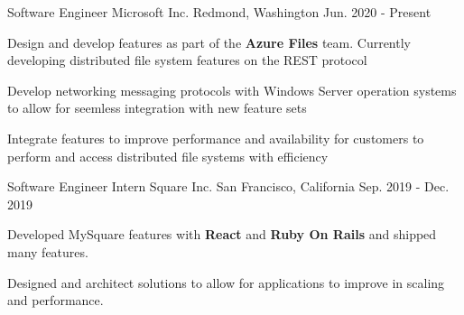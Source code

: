 


\begin{cventries}

\begin{comment}
\cventry
{Software Engineer Intern}
{Microsoft}
{Redmond, Washington}
{Jun. 2018 - Sep. 2018}
{
\begin{cvitems}
\item {Will develop on the frameworks team}
\end{cvitems}
}
\end{comment}

\cventry
	{Software Engineer}
	{Microsoft Inc.}
	{Redmond, Washington}
	{Jun. 2020 - Present}
{								
	\begin{cvitems} 
        \item {Design and develop features as part of the \textbf{Azure Files} team. Currently developing distributed file system features on the REST protocol}
        \item {Develop networking messaging protocols with Windows Server operation systems to allow for seemless integration with new feature sets}
        \item {Integrate features to improve performance and availability for customers to perform and access distributed file systems with efficiency}
	\end{cvitems}
}


\cventry
	{Software Engineer Intern}
	{Square Inc.}
	{San Francisco, California}
	{Sep. 2019 - Dec. 2019}
{								
	\begin{cvitems} 
	\item {Developed MySquare features with \textbf{React} and \textbf{Ruby On Rails} and shipped many features.}
	\item {Designed and architect solutions to allow for applications to improve in scaling and performance.}
	\end{cvitems}
}


\end{cventries}
